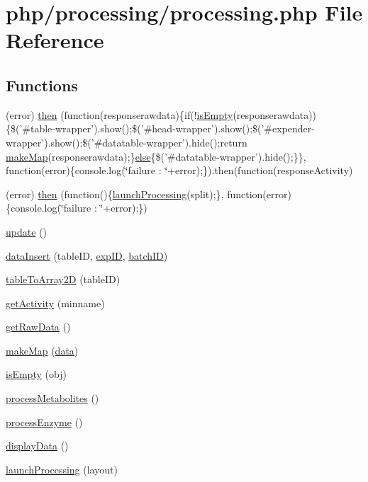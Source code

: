 \hypertarget{processing_8php}{\section{php/processing/processing.php File Reference}
\label{processing_8php}
}
\subsection*{Functions}
\begin{DoxyCompactItemize}
\item 
(error) \hyperlink{processing_8php_a4bb5a64bedf6f6d54b01f0a8b4eae126}{then} (function(responserawdata)\{if(!\hyperlink{processing_8php_a1901fb6da4e06e8f5465ffcbba77291d}{is\-Empty}(responserawdata))\{\$('\#table-\/wrapper').show();\$('\#head-\/wrapper').show();\$('\#expender-\/wrapper').show();\$('\#datatable-\/wrapper').hide();return \hyperlink{processing__bak_8php_aa5611b9056cce4a61fe798b64bed77a8}{make\-Map}(responserawdata);\}\hyperlink{insert__raw__data_8php_aa869f48d9730e52be32b3ada5833d2ac}{else}\{\$('\#datatable-\/wrapper').hide();\}\}, function(error)\{console.\-log(\char`\"{}failure \-: \char`\"{}+error);\}).then(function(response\-Activity)
\item 
(error) \hyperlink{processing_8php_acdf44d17add07e01f71455eb09ab7004}{then} (function()\{\hyperlink{processing__bak_8php_a1712a87d461ae7a47d0e803ac67965ce}{launch\-Processing}(split);\}, function(error)\{console.\-log(\char`\"{}failure \-: \char`\"{}+error);\})
\item 
\hyperlink{processing_8php_a842e4774e3b3601a005b995c02f7e883}{update} ()
\item 
\hyperlink{processing_8php_a89da1e95057c1fbc88b341bca8f9e045}{data\-Insert} (table\-I\-D, \hyperlink{admin_rawdata_8php_a888d53a6517f4272b5982c3ca9d16e8a}{exp\-I\-D}, \hyperlink{obsolete_2processing__bak_8php_a88c5bc4262b7c34f236357f5c53fc99b}{batch\-I\-D})
\item 
\hyperlink{processing_8php_afb304d762110b44295d7a6276258371e}{table\-To\-Array2\-D} (table\-I\-D)
\item 
\hyperlink{processing_8php_a4209a7ca658d6c033b0748520c6d66a3}{get\-Activity} (minname)
\item 
\hyperlink{processing_8php_ab2fc904496e1d2bc27e61ecd4586d7e8}{get\-Raw\-Data} ()
\item 
\hyperlink{processing_8php_a1a597c249cda65f7470ae1f0c2613e07}{make\-Map} (\hyperlink{chart1_8php_ab3ed669f4b3fdb8c88f3a190fb907de0}{data})
\item 
\hyperlink{processing_8php_a1901fb6da4e06e8f5465ffcbba77291d}{is\-Empty} (obj)
\item 
\hyperlink{processing_8php_a47de9698475b6df6d67de31018af835e}{process\-Metabolites} ()
\item 
\hyperlink{processing_8php_a7d55c50976945779a4db3f8fa38c1a83}{process\-Enzyme} ()
\item 
\hyperlink{processing_8php_a0ad1822364312d61095a470b8ca3639b}{display\-Data} ()
\item 
\hyperlink{processing_8php_a1712a87d461ae7a47d0e803ac67965ce}{launch\-Processing} (layout)
\end{DoxyCompactItemize}
